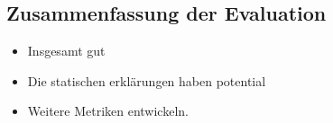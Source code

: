 \subsection{Zusammenfassung der Evaluation}

\begin{itemize}
    \item Insgesamt gut
    \item Die statischen erklärungen haben potential
    \item Weitere Metriken entwickeln.
\end{itemize}

